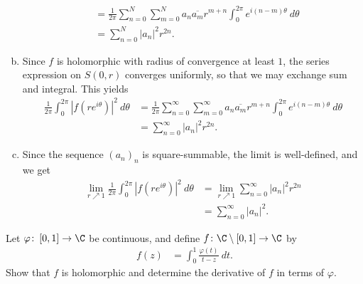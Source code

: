 \documentclass[10pt]{mypackage}
\begin{document}
\begin{solution}
\begin{enumerate}[(a)]
\begin{align*}
                                                                                                       &= \frac{1}{2\pi} \sum_{n=0}^{N}\sum_{m=0}^{N} a_n \overline{a_m} r^{m + n} \int_{0}^{2\pi} e^{i\left( n-m \right)\theta}\:d\theta\\
                                                                                                       &= \sum_{n=0}^{N} \left\vert a_n \right\vert^2 r^{2n}.
      \end{align*}
    \item Since $f$ is holomorphic with radius of convergence at least $1$, the series expression on $ S\left( 0,r \right) $ converges uniformly, so that we may exchange sum and integral. This yields
      \begin{align*}
        \frac{1}{2\pi} \int_{0}^{2\pi} \left\vert f\left( re^{i\theta} \right) \right\vert^2\:d\theta &= \frac{1}{2\pi}\sum_{n=0}^{\infty}\sum_{m=0}^{\infty}a_n \overline{a_m} r^{m + n} \int_{0}^{2\pi} e^{i\left( n-m \right)\theta}\:d\theta\\
                                                                                                      &= \sum_{n=0}^{\infty}\left\vert a_n \right\vert^2 r^{2n}.
      \end{align*}
    \item Since the sequence $\left( a_n \right)_n$ is square-summable, the limit is well-defined, and we get
      \begin{align*}
        \lim_{r\nearrow 1} \frac{1}{2\pi} \int_{0}^{2\pi} \left\vert f\left( re^{i\theta} \right) \right\vert^2\:d\theta &= \lim_{r\nearrow 1} \sum_{n=0}^{\infty}\left\vert a_n \right\vert^2 r^{2n}\\
                                                                                                                         &= \sum_{n=0}^{\infty}\left\vert a_n \right\vert^2.
      \end{align*}
  \end{enumerate}
\end{solution}
\begin{problem}[Problem 2]
  Let $\varphi\colon \left[ 0,1 \right]\rightarrow \C$ be continuous, and define $f\colon \C\setminus \left[ 0,1 \right]\rightarrow \C$ by
  \begin{align*}
    f(z) &= \int_{0}^{1} \frac{\varphi(t)}{t-z}\:dt.
  \end{align*}
  Show that $f$ is holomorphic and determine the derivative of $f$ in terms of $\varphi$.
\end{problem}
\end{document}
